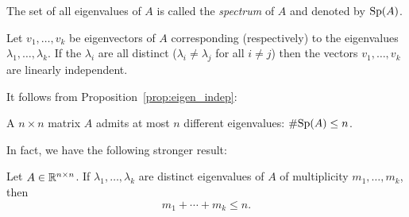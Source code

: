 \documentclass[11pt,nocut]{article}
\begin{document}
\begin{definition}
	The set of all eigenvalues of $A$ is called the \emph{spectrum} of $A$ and denoted by ${{\rm Sp}}(A)$.
\end{definition}

\begin{proposition}\label{prop:eigen_indep}
	Let $v_1, \dots, v_k$ be eigenvectors of $A$ corresponding (respectively) to the eigenvalues $\lambda_1, \dots, \lambda_k$.
	If the $\lambda_i$ are all distinct ($\lambda_i \neq \lambda_j$ for all $i \neq j$) then the vectors $v_1, \dots, v_k$ are linearly independent.
\end{proposition}

It follows from Proposition~\ref{prop:eigen_indep}:

\begin{corollary}
	A $n \times n$ matrix $A$ admits at most $n$ different eigenvalues: $\# {{\rm Sp}}(A) \leq n$.
\end{corollary}

In fact, we have the following stronger result:

\begin{proposition}
	Let $A \in \mathbb{R}^{n \times n}$. If $\lambda_1, \dots, \lambda_k$ are distinct eigenvalues of $A$ of multiplicity $m_1, \dots, m_k$, then
	$$
	m_1 + \cdots + m_k \leq n.
	$$
\end{proposition}




\end{document}
